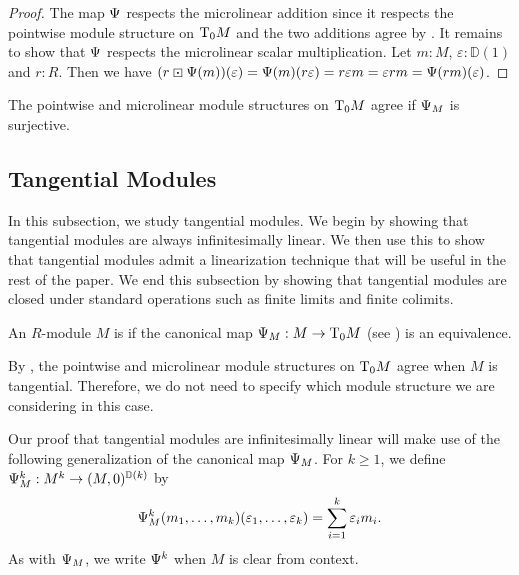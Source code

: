 \begin{proof}
  The map $\can$ respects the microlinear addition since it respects the pointwise module structure on $\tangent{M}{0}$ and the two additions agree by .
  It remains to show that $\can$ respects the microlinear scalar multiplication.
  Let $m : M$, $\varepsilon : \mathbb{D}(1)$ and $r : R$.
  Then we have $(r\boxdot\can(m))(\varepsilon) = \can(m)(r\varepsilon) = r\varepsilon m = \varepsilon rm = \can(rm)(\varepsilon)$.
\end{proof}

\begin{remark}\label{rem:pointwise-microlinear-agree}
  The pointwise and microlinear module structures on $\tangent{M}{0}$ agree if $\can_M$ is surjective.
\end{remark}

\subsection{Tangential Modules}

In this subsection, we study tangential modules.
We begin by showing that tangential modules are always infinitesimally linear.
We then use this to show that tangential modules admit a linearization technique that will be useful in the rest of the paper.
We end this subsection by showing that tangential modules are closed under standard operations such as finite limits and finite colimits.

\begin{definition}\label{def:tangential}
  An $R$-module $M$ is  if the canonical map $\can_M : M \rightarrow \tangent{M}{0}$ (see ) is an equivalence.
\end{definition}

\begin{remark}
By , the pointwise and microlinear module
structures on $\tangent{M}{0}$ agree when $M$ is tangential.
Therefore, we do not need to specify which module structure we are considering in this case.
\end{remark}

Our proof that tangential modules are infinitesimally linear will make use of the following generalization of the canonical map $\can_M$.
For $k \geq 1$, we define $\can_M^k : M^k \to (M,0)^{\D(k)}$ by
\[
\can_M^k (m_1, \dots, m_k) (\varepsilon_1, \dots, \varepsilon_k) = \sum_{i=1}^k \varepsilon_i m_i .
\]
As with $\can_M$, we write $\can^k$ when $M$ is clear from context.

